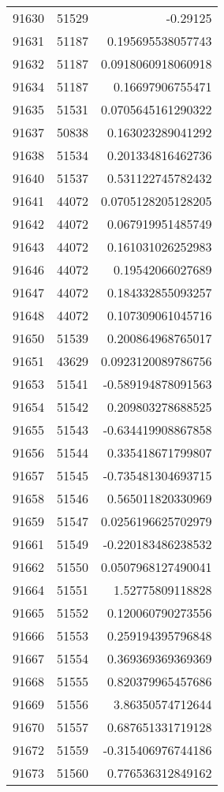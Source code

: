 \begin{tabular}{r | r | r}
91630 & 51529 & -0.29125 \\
91631 & 51187 & 0.195695538057743 \\
91632 & 51187 & 0.0918060918060918 \\
91634 & 51187 & 0.16697906755471 \\
91635 & 51531 & 0.0705645161290322 \\
91637 & 50838 & 0.163023289041292 \\
91638 & 51534 & 0.201334816462736 \\
91640 & 51537 & 0.531122745782432 \\
91641 & 44072 & 0.0705128205128205 \\
91642 & 44072 & 0.067919951485749 \\
91643 & 44072 & 0.161031026252983 \\
91646 & 44072 & 0.19542066027689 \\
91647 & 44072 & 0.184332855093257 \\
91648 & 44072 & 0.107309061045716 \\
91650 & 51539 & 0.200864968765017 \\
91651 & 43629 & 0.0923120089786756 \\
91653 & 51541 & -0.589194878091563 \\
91654 & 51542 & 0.209803278688525 \\
91655 & 51543 & -0.634419908867858 \\
91656 & 51544 & 0.335418671799807 \\
91657 & 51545 & -0.735481304693715 \\
91658 & 51546 & 0.565011820330969 \\
91659 & 51547 & 0.0256196625702979 \\
91661 & 51549 & -0.220183486238532 \\
91662 & 51550 & 0.0507968127490041 \\
91664 & 51551 & 1.52775809118828 \\
91665 & 51552 & 0.120060790273556 \\
91666 & 51553 & 0.259194395796848 \\
91667 & 51554 & 0.369369369369369 \\
91668 & 51555 & 0.820379965457686 \\
91669 & 51556 & 3.86350574712644 \\
91670 & 51557 & 0.687651331719128 \\
91672 & 51559 & -0.315406976744186 \\
91673 & 51560 & 0.776536312849162 \\

\end{tabular}
